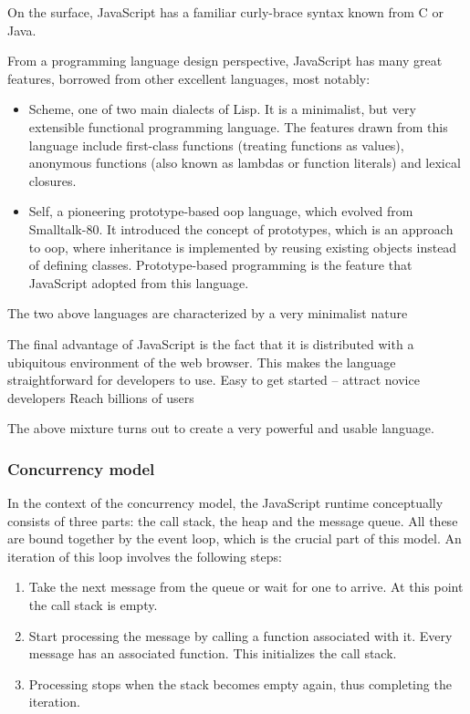 On the surface, JavaScript has a familiar curly-brace syntax known from C or Java.

From a programming language design perspective, JavaScript has many great
features, borrowed from other excellent languages\cite[Section~4~Overview]{ecmascript}, most notably:
\begin{itemize}
   \item Scheme, one of two main dialects of Lisp\cite{r7rs}. It is a minimalist, but very extensible functional programming language. The features drawn from this language include first-class functions (treating functions as values), anonymous functions (also known as lambdas or function literals) and lexical closures.
   \item Self, a pioneering prototype-based \acrlong{oop} language\cite{self_handbook}, which evolved from Smalltalk-80\cite{smalltalk_history}. It introduced the concept of prototypes, which is an approach to \acrshort{oop}, where inheritance is implemented by reusing existing objects instead of defining classes. Prototype-based programming is the feature that JavaScript adopted from this language.
\end{itemize}
The two above languages are characterized by a very minimalist nature

The final advantage of JavaScript is the fact that it is distributed with a ubiquitous environment of the web browser. This makes the language straightforward for developers to use.
Easy to get started -- attract novice developers
Reach billions of users\cite{internet_stats}

The above mixture turns out to create a very powerful and usable language.

\subsubsection{Concurrency model}
In the context of the concurrency model, the JavaScript runtime conceptually
consists of three parts: the call stack, the heap and the message queue. All
these are bound together by the event loop\cite{mdn_concurrency}, which is the crucial part of this model.  An iteration of this loop involves the following steps:
\begin{enumerate}
	\item Take the next message from the queue or wait for one to arrive. At
          this point the call stack is empty.
	\item Start processing the message by calling a function associated with
          it. Every message has an associated function. This initializes the
          call stack.
	\item Processing stops when the stack becomes empty again, thus
          completing the iteration.
\end{enumerate}

